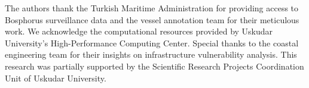 \documentclass[10pt]{article}
\begin{document}
\begin{acknowledgements}
The authors thank the Turkish Maritime Administration for providing access to Bosphorus surveillance data and the vessel annotation team for their meticulous work. We acknowledge the computational resources provided by Uskudar University's High-Performance Computing Center. Special thanks to the coastal engineering team for their insights on infrastructure vulnerability analysis. This research was partially supported by the Scientific Research Projects Coordination Unit of Uskudar University.
\end{acknowledgements}



\end{document}
